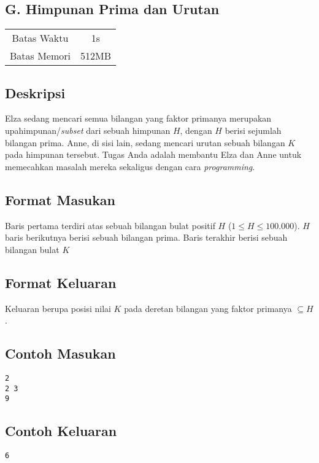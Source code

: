 \documentclass{article}
\begin{document}
\begin{center}
    \section*{G. Himpunan Prima dan Urutan} %

    \begin{tabular}{ | c c | }
        \hline
        Batas Waktu  & 1s \\    %
        Batas Memori & 512MB \\  %
        \hline
    \end{tabular}
\end{center}

\subsection*{Deskripsi}

Elza sedang mencari semua bilangan yang faktor primanya merupakan upahimpunan/\textit{subset} dari sebuah himpunan $H$, dengan $H$ berisi sejumlah bilangan prima.
Anne, di sisi lain, sedang mencari urutan sebuah bilangan $K$ pada himpunan tersebut.
Tugas Anda adalah membantu Elza dan Anne untuk memecahkan masalah mereka sekaligus dengan cara \textit{programming}.

\subsection*{Format Masukan}

Baris pertama terdiri atas sebuah bilangan bulat positif $H$ ($1 \leq H \leq 100.000$).
$H$ baris berikutnya berisi sebuah bilangan prima.
Baris terakhir berisi sebuah bilangan bulat $K$

\subsection*{Format Keluaran}

Keluaran berupa posisi nilai $K$ pada deretan bilangan yang faktor primanya $\subseteq H$.
\\

\begin{multicols}{2}
\subsection*{Contoh Masukan}
\begin{lstlisting}
2
2 3
9
\end{lstlisting}
\columnbreak
\subsection*{Contoh Keluaran}
\begin{lstlisting}
6
\end{lstlisting}
\vfill
\null
\end{multicols}


\pagebreak
\end{document}
